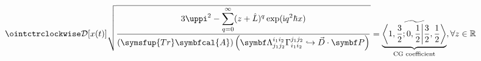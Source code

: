 \documentclass{standalone}
\begin{document}
\Huge
$\displaystyle \ointctrclockwise\mathcal{D}[x(t)]\sqrt{\frac{\displaystyle3\uppi^2-\sum_{q=0}^{\infty}(z+\hat L)^{q}\exp(\mathrm{i}q^2 \hbar x)}{\displaystyle (\symsfup{Tr}\symbfcal{A})\left(\symbf\Lambda_{j_1j_2}^{i_1i_2}\Gamma_{i_1i_2}^{j_1j_2}\hookrightarrow\vec D\cdot \symbf P  \right)}}
=\underbrace{\widetilde{\left\langle1,\frac{3}{2};0,\frac{1}{2}\middle\vert \frac{3}{2},\frac{1}{2}\right\rangle}}_{\text{CG coefficient}} ,\forall z \in \mathbb{R}$
\end{document}
